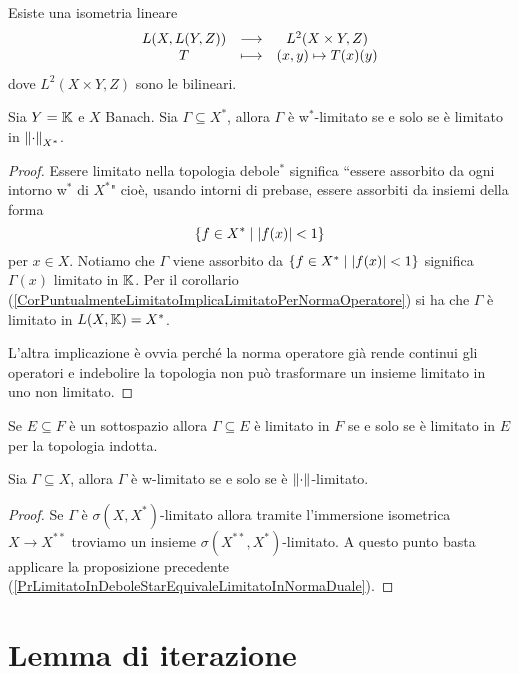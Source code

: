 \begin{exercise}
Esiste una isometria lineare
\[\begin{array}{ccc} {L(X,L(Y,Z))} & \longrightarrow & {L^2(X\times Y,Z)}\\ {T} & \longmapsto & {(x,y)\mapsto T(x)(y)} \end{array}\]
dove $L^2(X\times Y,Z)$ sono le bilineari.
\end{exercise}

\begin{proposition}\label{PrLimitatoInDeboleStarEquivaleLimitatoInNormaDuale}
Sia $Y=\mathbb{K}$ e $X$ Banach. Sia $\Gamma\subseteq X^\ast$, allora $\Gamma$ \`e w$^\ast$-limitato se e solo se \`e limitato in $\left\Vert{\cdot}\right\Vert_{X^\ast}$.
\end{proposition}
\begin{proof}
Essere limitato nella topologia debole$^\ast$ significa ``essere assorbito da ogni intorno w$^\ast$ di $X^\ast$" cio\`e, usando intorni di prebase, essere assorbiti da insiemi della forma
\[\left\{{f\in X^\ast\mid \left|{f(x)}\right|<1}\right\}\]
per $x\in X$. Notiamo che $\Gamma$ viene assorbito da $\left\{{f\in X^\ast\mid \left|{f(x)}\right|<1}\right\}$ significa $\Gamma(x)$ limitato in $\mathbb{K}$. Per il corollario (\ref{CorPuntualmenteLimitatoImplicaLimitatoPerNormaOperatore}) si ha che $\Gamma$ \`e limitato in $L(X,\mathbb{K})=X^\ast$.

L'altra implicazione \`e ovvia perch\'e la norma operatore gi\`a rende continui gli operatori e indebolire la topologia non pu\`o trasformare un insieme limitato in uno non limitato.
\end{proof}

\begin{remark}
Se $E\subseteq F$ \`e un sottospazio allora $\Gamma\subseteq E$ \`e limitato in $F$ se e solo se \`e limitato in $E$ per la topologia indotta.
\end{remark}

\begin{proposition}
Sia $\Gamma\subseteq X$, allora $\Gamma$ \`e w-limitato se e solo se \`e $\left\Vert{\cdot}\right\Vert$-limitato.
\end{proposition}
\begin{proof}
Se $\Gamma$ \`e $\sigma(X,X^\ast)$-limitato allora tramite l'immersione isometrica $X\to X^{\ast\ast}$ troviamo un insieme $\sigma(X^{\ast\ast},X^\ast)$-limitato. A questo punto basta applicare la proposizione precedente (\ref{PrLimitatoInDeboleStarEquivaleLimitatoInNormaDuale}).
\end{proof}

\section{Lemma di iterazione}

